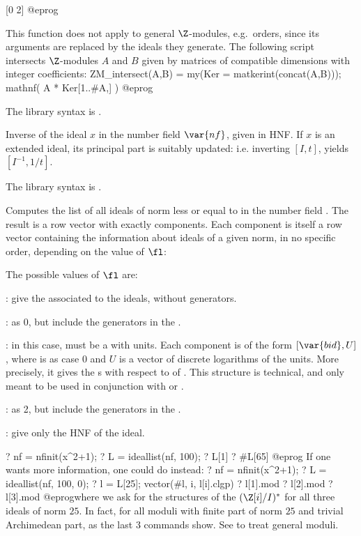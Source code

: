 [0 2]
@eprog

This function does not apply to general $\Z$-modules, e.g.~orders, since its
arguments are replaced by the ideals they generate. The following script
intersects $\Z$-modules $A$ and $B$ given by matrices of compatible
dimensions with integer coefficients:
\bprog
ZM_intersect(A,B) =
{ my(Ker = matkerint(concat(A,B)));
  mathnf( A * Ker[1..#A,] )
}
@eprog

The library syntax is .

\label{se:idealinv}
Inverse of the ideal $x$ in the
number field $\var{nf}$, given in HNF. If $x$ is an extended
ideal, its principal part is suitably
updated: i.e. inverting $[I,t]$, yields $[I^{-1}, 1/t]$.

The library syntax is .

\label{se:ideallist}
Computes the list
of all ideals of norm less or equal to  in the number field
. The result is a row vector with exactly  components.
Each component is itself a row vector containing the information about
ideals of a given norm, in no specific order, depending on the value of
$\fl$:

The possible values of $\fl$ are:

: give the  associated to the ideals, without generators.

: as 0, but include the generators in the .

: in this case,  must be a  with units. Each
component is of the form $[\var{bid},U]$, where  is as case 0
and $U$ is a vector of discrete logarithms of the units. More precisely, it
gives the s with respect to  of .
This structure is technical, and only meant to be used in conjunction with
 or .

: as 2, but include the generators in the .

: give only the HNF of the ideal.

\bprog
? nf = nfinit(x^2+1);
? L = ideallist(nf, 100);
? L[1]
? #L[65]
@eprog
If one wants more information, one could do instead:
\bprog
? nf = nfinit(x^2+1);
? L = ideallist(nf, 100, 0);
? l = L[25]; vector(#l, i, l[i].clgp)
? l[1].mod
? l[2].mod
? l[3].mod
@eprog\noindent where we ask for the structures of the $(\Z[i]/I)^*$ for all
three ideals of norm $25$. In fact, for all moduli with finite part of norm
$25$ and trivial Archimedean part, as the last 3 commands show. See
 to treat general moduli.

